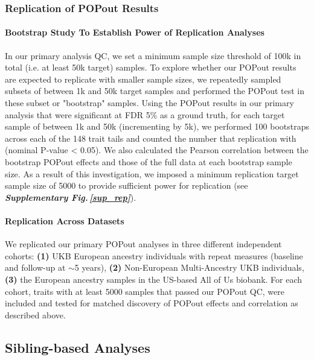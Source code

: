 \documentclass[12pt]{zHenriquesLab-StyleBioRxiv}
\newcommand\sref[1]{\normalsize{\textbf{\textit{Supplementary Fig.\,\ref{#1}}}}\normalsize{}}
\begin{document}
{{{\subsubsection*{Replication of POPout Results}
\paragraph{Bootstrap Study To Establish Power of Replication Analyses}
In our primary analysis QC, we set a minimum sample size threshold of 100k in total 
(i.e. at least 50k target) samples. To explore whether our POPout results are expected 
to replicate with smaller sample sizes, we repeatedly sampled subsets of between 1k and 50k 
target samples and performed the POPout test in these subset or "bootstrap" samples. 
Using the POPout results in our primary analysis that were significant at FDR 5\% as a ground 
truth, for each target sample of between 1k and 50k (incrementing by 5k), 
we performed 100 bootstraps across each of the 148 trait tails and counted 
the number that replication with (nominal P-value < 0.05). 
We also calculated the Pearson correlation between the bootstrap 
POPout effects and those of the full data at each bootstrap sample size. As a result of 
this investigation, we imposed a minimum replication target sample size of 5000 to 
provide sufficient power for replication (see \sref{sup_rep}). 
}

\paragraph{Replication Across Datasets} 
We replicated our primary POPout analyses in three different independent cohorts:  
\textbf{(1)} UKB European ancestry individuals with repeat measures (baseline and follow-up at $\sim$5 years), 
\textbf{(2)} Non-European Multi-Ancestry UKB individuals, \textbf{(3)} the European ancestry samples in the 
US-based All of Us biobank. For each cohort, traits with at least 5000 samples that passed our POPout QC, 
were included and tested for matched discovery of POPout effects and correlation as described above. 


%
\subsection*{Sibling-based Analyses} \label{sec:methods:sibs}  
%
}}
\end{document}
